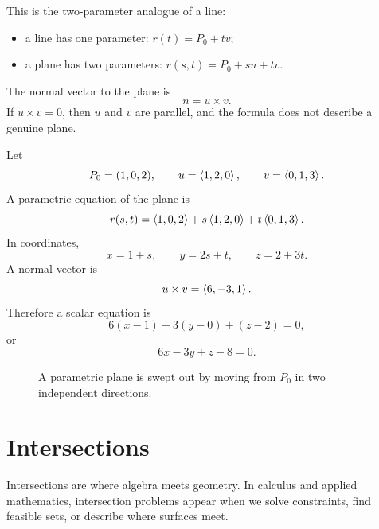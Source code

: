 This is the two-parameter analogue of a line:
\begin{itemize}
\item a line has one parameter: $r(t)=P_0+tv$;
\item a plane has two parameters: $r(s,t)=P_0+su+tv$.
\end{itemize}
The normal vector to the plane is
\[
  n=u\times v.
\]
If $u\times v=0$, then $u$ and $v$ are parallel, and the formula does not describe a genuine plane.

\begin{examplebox}[title={Example 4.6: Parametric and scalar plane equations}]
Let
\[
  P_0=(1,0,2),\qquad u=\left\langle 1,2,0\right\rangle,\qquad v=\left\langle 0,1,3\right\rangle.
\]
A parametric equation of the plane is
\[
  r(s,t)=\left\langle 1,0,2\right\rangle+s\left\langle 1,2,0\right\rangle+t\left\langle 0,1,3\right\rangle.
\]
In coordinates,
\[
  x=1+s,\qquad y=2s+t,\qquad z=2+3t.
\]
A normal vector is
\[
  u\times v=\left\langle 6,-3,1\right\rangle.
\]
Therefore a scalar equation is
\[
  6(x-1)-3(y-0)+(z-2)=0,
\]
or
\[
  6x-3y+z-8=0.
\]
\end{examplebox}

\begin{figure}[H]
\centering
{}
\caption{A parametric plane is swept out by moving from $P_0$ in two independent directions.}
\end{figure}

\section{Intersections}

Intersections are where algebra meets geometry. In calculus and applied mathematics, intersection problems appear when we solve constraints, find feasible sets, or describe where surfaces meet.

